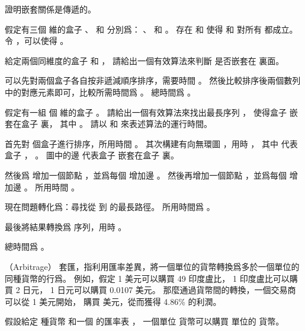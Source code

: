 \startigBase[a]\startitem
證明嵌套關係是傳遞的。
\stopitem\stopigBase

\startANSWER
假定有三個  維的盒子 、  和  分別爲：
 、  和 。
存在  和  使得  和  對所有  都成立。
令 ，可以使得 。
\stopANSWER

\startigBase[continue]\startitem
給定兩個同維度的盒子  和 ，
請給出一個有效算法來判斷  是否嵌套在  裏面。
\stopitem\stopigBase

\startANSWER
可以先對兩個盒子各自按非遞減順序排序，需要時間 。
然後比較排序後兩個數列中的對應元素即可，比較所需時間爲 。
總時間爲 。
\stopANSWER

\startigBase[continue]\startitem
假定有一組  個  維的盒子 。
請給出一個有效算法來找出最長序列 ，
使得盒子  嵌套在盒子  裏，
其中 。
請以  和  來表述算法的運行時間。
\stopitem\stopigBase

\startANSWER
首先對  個盒子進行排序，所用時間 。
其次構建有向無環圖 ，用時 ，
其中  代表盒子 ， 。
圖中的邊  代表盒子  嵌套在盒子  裏。

然後爲  增加一個節點 ，並爲每個  增加邊 。
然後再增加一個節點 ，並爲每個  增加邊 。
所用時間 。

現在問題轉化爲：尋找從  到  的最長路徑。
所用時間爲 。

最後將結果轉換爲  序列，用時 。

總時間爲 。
\stopANSWER

\stopPROBLEM

\startPROBLEM
（Arbitrage）
{\EMP 套匯}，指利用匯率差異，將一個單位的貨幣轉換爲多於一個單位的同種貨幣的行爲。
例如，假定 1 美元可以購買 49 印度盧比， 1 印度盧比可以購買 2 日元， 1 日元可以購買 0.0107 美元。
那麼通過貨幣間的轉換，一個交易商可以從 1 美元開始，
購買  美元，從而獲得 4.86\% 的利潤。

假設給定  種貨幣  和一個  的匯率表 ，
一個單位  貨幣可以購買  單位的  貨幣。

